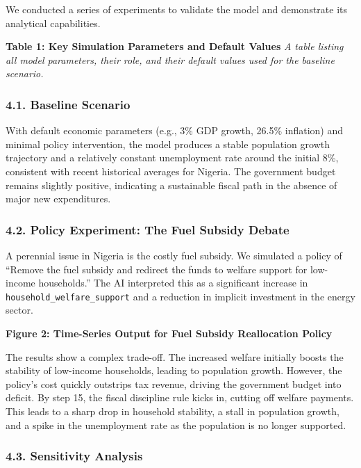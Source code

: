 \documentclass[
]{article}
\makeatletter
\newcommand*\pandocbounded[1]{%
  \sbox\pandoc@box{#1}%
  \Gscale@div\@tempa{\textheight}{\dimexpr\ht\pandoc@box+\dp\pandoc@box\relax}%
  \Gscale@div\@tempb{\linewidth}{\wd\pandoc@box}%
  \ifdim\@tempb\p@<\@tempa\p@\let\@tempa\@tempb\fi%
  \ifdim\@tempa\p@<\p@\scalebox{\@tempa}{\usebox\pandoc@box}%
  \else\usebox{\pandoc@box}%
  \fi%
}
\makeatother
\begin{document}
We conducted a series of experiments to validate the model and
demonstrate its analytical capabilities.

\textbf{Table 1: Key Simulation Parameters and Default Values} \emph{A
table listing all model parameters, their role, and their default values
used for the baseline scenario.}

\subsubsection{4.1. Baseline Scenario}\label{baseline-scenario}

With default economic parameters (e.g., 3\% GDP growth, 26.5\%
inflation) and minimal policy intervention, the model produces a stable
population growth trajectory and a relatively constant unemployment rate
around the initial 8\%, consistent with recent historical averages for
Nigeria. The government budget remains slightly positive, indicating a
sustainable fiscal path in the absence of major new expenditures.

\subsubsection{4.2. Policy Experiment: The Fuel Subsidy
Debate}\label{policy-experiment-the-fuel-subsidy-debate}

A perennial issue in Nigeria is the costly fuel subsidy. We simulated a
policy of ``Remove the fuel subsidy and redirect the funds to welfare
support for low-income households.'' The AI interpreted this as a
significant increase in \texttt{household\_welfare\_support} and a
reduction in implicit investment in the energy sector.

\textbf{Figure 2: Time-Series Output for Fuel Subsidy Reallocation
Policy}
\pandocbounded{}

The results show a complex trade-off. The increased welfare initially
boosts the stability of low-income households, leading to population
growth. However, the policy's cost quickly outstrips tax revenue,
driving the government budget into deficit. By step 15, the fiscal
discipline rule kicks in, cutting off welfare payments. This leads to a
sharp drop in household stability, a stall in population growth, and a
spike in the unemployment rate as the population is no longer supported.

\subsubsection{4.3. Sensitivity Analysis}\label{sensitivity-analysis}
\end{document}
